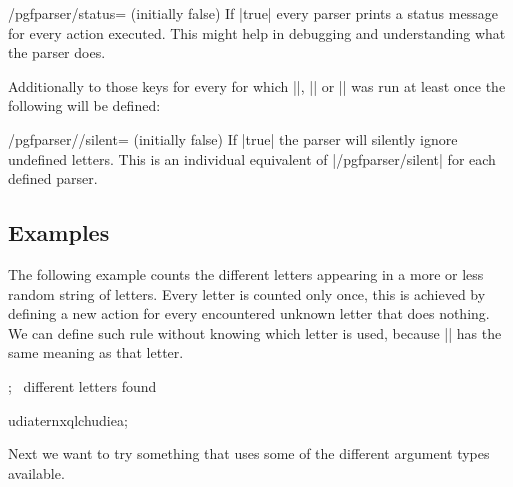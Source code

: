 \begin{key}{/pgfparser/status= (initially false)}%
  If |true| every parser prints a status message for every action executed. This
  might help in debugging and understanding what the parser does.
\end{key}%

Additionally to those keys for every  for which
|\pgfparserdef|, |\pgfparserdefunknown| or |\pgfparserlet| was run at least once
the following will be defined:

\begin{key}{/pgfparser//silent= (initially false)}%
  If |true| the parser  will silently ignore undefined
  letters. This is an individual equivalent of |/pgfparser/silent| for each
  defined parser.
\end{key}%


\subsection{Examples}

The following example counts the different letters appearing in a more or less
random string of letters. Every letter is counted only once, this is achieved
by defining a new action for every encountered unknown letter that does
nothing. We can define such rule without knowing which letter is used, because
|\pgfparsertoken| has the same meaning as that letter.
%
\begin{codeexample}[
    preamble={\usepgfmodule{parser}},
    pre={\newcount\mycount},
]
;{}%
%
  {\pgfparsertoken{}\advance{}}%
%
  {\the\mycount\ different letters found}%
%

udiaternxqlchudiea;
\end{codeexample}%

Next we want to try something that uses some of the different argument types
available.
%
%

